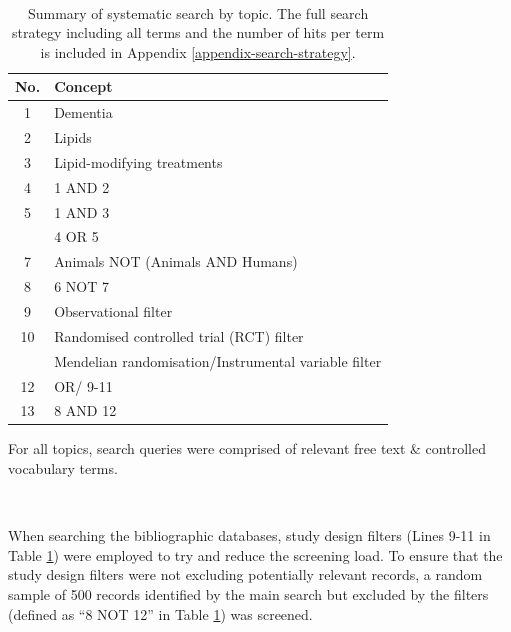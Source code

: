 \documentclass[a4paper, twoside]{templates/ociamthesis}
\begin{document}
~





\begin{table}[H]

\caption[searchOverview]{\label{tab:searchOverview-table}Summary of systematic search by topic. The full search strategy including all terms and the number of hits per term is included in Appendix \ref{appendix-search-strategy}.}
\centering
\fontsize{10}{12}\selectfont
\begin{threeparttable}
\begin{tabular}[t]{>{}cl}
\toprule
\textbf{No.} & \textbf{Concept}\\
\midrule
1 & Dementia\\
\midrule
2 & Lipids\\
\midrule
3 & Lipid-modifying treatments\\
\midrule
4 & 1 AND 2\\
\midrule
5 & 1 AND 3\\
\midrule
\addlinespace
6 & 4 OR 5\\
\midrule
7 & Animals NOT (Animals AND Humans)\\
\midrule
8 & 6 NOT 7\\
\midrule
9 & Observational filter\\
\midrule
10 & Randomised controlled trial (RCT) filter\\
\midrule
\addlinespace
11 & Mendelian randomisation/Instrumental variable filter\\
\midrule
12 & OR/ 9-11\\
\midrule
13 & 8 AND 12\\
\bottomrule
\end{tabular}
\begin{tablenotes}
\item For all topics, search queries were comprised of relevant free text \& controlled vocabulary terms.
\end{tablenotes}
\end{threeparttable}
\end{table}

~

When searching the bibliographic databases, study design filters (Lines 9-11 in Table \ref{tab:searchOverview-table}) were employed to try and reduce the screening load. To ensure that the study design filters were not excluding potentially relevant records, a random sample of 500 records identified by the main search but excluded by the filters (defined as ``8 NOT 12'' in Table \ref{tab:searchOverview-table}) was screened.
\end{document}
